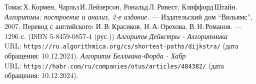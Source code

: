 \begin{thebibliography}{99}
Томас\,Х.\,Кормен, Чарльз\,И.\,Лейзерсон, Рональд\,Л.\,Ривест, Клиффорд\,Штайн.
{\itshape Алгоритмы: построение и анализ, 2-е издание.} --- Издательский дом \enquote{Вильямс}, 2007. Перевод с английского: И.\,В.\,Красиков, Н.\,А.\,Орехова, В.\,Н.\,Романов. --- 1296 с. (ISBN 5-8459-0857-4 (рус.))
{\itshape Алгоритм Дейкстры - Алгоритмика} \\URL: \texttt{https://ru.algorithmica.org/cs/shortest-paths/dijkstra/} (дата обращения: 10.12.2024).
{\itshape Алгоритм Беллмана-Форда - Хабр} \\URL: \texttt{https://habr.com/ru/companies/otus/articles/484382/} (дата обращения: 10.12.2024).
\end{thebibliography}
\pagebreak
